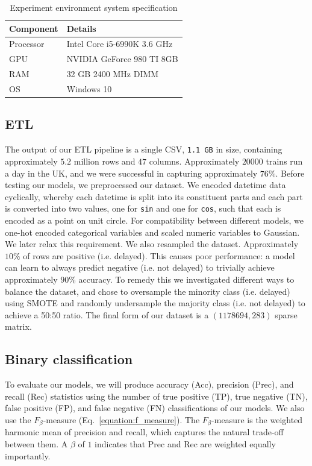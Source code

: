 \documentclass[12pt,a4paper]{article}
\begin{document}
\begin{table}[htb]
\centering
\caption{Experiment environment system specification}
\label{table:experiment}
\begin{tabular}{|l|l|}
\hline
{\bf Component} & {\bf Details}                     \\ \hline
Processor & Intel Core i5-6990K 3.6 GHz \\ \hline
GPU       & NVIDIA GeForce 980 TI 8GB   \\ \hline
RAM       & 32 GB 2400 MHz DIMM         \\ \hline
OS        & Windows 10                  \\ \hline
\end{tabular}
\end{table}

\subsection{ETL}

The output of our ETL pipeline is a single CSV, \verb|1.1 GB| in size, containing approximately $5.2$ million rows and $47$ columns. Approximately $20000$ trains run a day in the UK, and we were successful in capturing approximately $76\%$. Before testing our models, we preprocessed our dataset. We encoded datetime data cyclically, whereby each datetime is split into its constituent parts and each part is converted into two values, one for \verb|sin| and one for \verb|cos|, such that each is encoded as a point on unit circle. For compatibility between different models, we one-hot encoded categorical variables and scaled numeric variables to Gaussian. We later relax this requirement. We also resampled the dataset. Approximately $10\%$ of rows are positive (i.e. delayed). This causes poor performance: a model can learn to always predict negative (i.e. not delayed) to trivially achieve approximately $90$\% accuracy. To remedy this we investigated different ways to balance the dataset, and chose to oversample the minority class (i.e. delayed) using SMOTE \cite{chawla_et_al_2002} and randomly undersample the majority class (i.e. not delayed) to achieve a 50:50 ratio. The final form of our dataset is a $(1178694, 283)$ sparse matrix.

\subsection{Binary classification}

To evaluate our models, we will produce accuracy (Acc), precision (Prec), and recall (Rec) statistics using the number of true positive (TP), true negative (TN), false positive (FP), and false negative (FN) classifications of our models. We also use the $F_\beta$-measure (Eq.~\ref{equation:f_measure}). The $F_\beta$-measure is the weighted harmonic mean of precision and recall, which captures the natural trade-off between them. A $\beta$ of $1$ indicates that Prec and Rec are weighted equally importantly.
\end{document}
